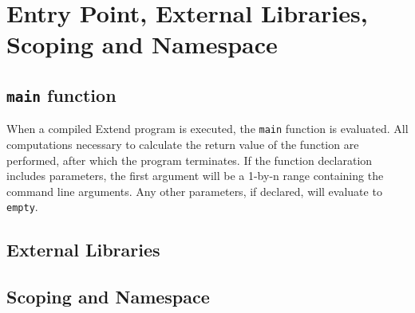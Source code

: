 \section{Entry Point, External Libraries, Scoping and Namespace}
\subsection{\texttt{main} function}
When a compiled Extend program is executed, the \texttt{main} function is evaluated. All computations necessary to calculate the return value of the function are performed, after which the program terminates. If the function declaration includes parameters, the first argument will be a 1-by-n range containing the command line arguments. Any other parameters, if declared, will evaluate to \texttt{empty}.
\subsection{External Libraries}
\label{sec:ExternFunctionSignatures}
\subsection{Scoping and Namespace}
